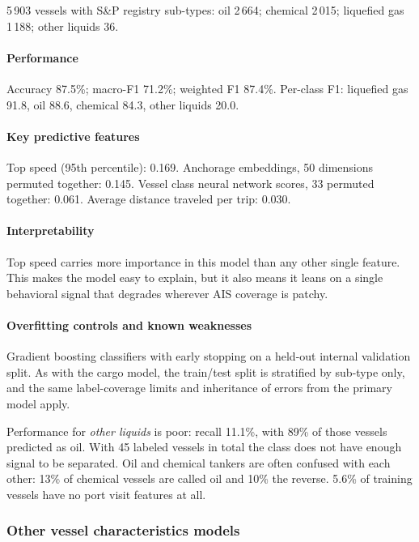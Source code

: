 \documentclass[lineno,pdflatex,sn-nature]{sn-jnl}
\begin{document}
5\,903 vessels with S\&P registry sub-types: oil 2\,664; chemical 2\,015; liquefied gas 1\,188; other liquids 36.

\paragraph{Performance}

Accuracy 87.5\%; macro-F1 71.2\%; weighted F1 87.4\%. Per-class F1: liquefied gas 91.8, oil 88.6, chemical 84.3, other liquids 20.0.

\paragraph{Key predictive features}

Top speed (95th percentile): 0.169. Anchorage embeddings, 50 dimensions permuted together: 0.145. Vessel class neural network scores, 33 permuted together: 0.061. Average distance traveled per trip: 0.030.

\paragraph{Interpretability}

Top speed carries more importance in this model than any other single feature. This makes the model easy to explain, but it also means it leans on a single behavioral signal that degrades wherever AIS coverage is patchy.

\paragraph{Overfitting controls and known weaknesses}

Gradient boosting classifiers with early stopping on a held-out internal validation split. As with the cargo model, the train/test split is stratified by sub-type only, and the same label-coverage limits and inheritance of errors from the primary model apply.

Performance for \emph{other liquids} is poor: recall 11.1\%, with 89\% of those vessels predicted as oil. With 45 labeled vessels in total the class does not have enough signal to be separated. Oil and chemical tankers are often confused with each other: 13\% of chemical vessels are called oil and 10\% the reverse. 5.6\% of training vessels have no port visit features at all.


\subsubsection{Other vessel characteristics models}\label{sec:vessel-characteristics-numeric-models}
\end{document}
